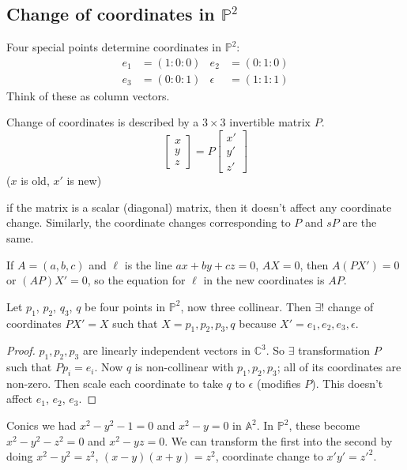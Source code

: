 \documentclass [letterpaper,11pt,twoside] {article}
\begin{document}
  \subsection{Change of coordinates in \texorpdfstring{$\mathbb P^2$}{P\^{}2}}
    Four special points determine coordinates in $\mathbb P^2$:
    \begin{align*}
      e_1 & = (1:0:0) & e_2 & = (0:1:0) \\
      e_3 & = (0:0:1) & \epsilon & = (1:1:1)
    \end{align*}
    Think of these as column vectors.

    Change of coordinates is described by a $3\times 3$ invertible matrix $P$.
    $$\begin{bmatrix} x \\ y \\ z \end{bmatrix} = P\begin{bmatrix} x' \\ y' \\ z' \end{bmatrix}$$
    ($x$ is old, $x'$ is new)

    if the matrix is a scalar (diagonal) matrix, then it doesn't affect any coordinate change.  Similarly, the coordinate changes corresponding to $P$ and $sP$ are the same.

    If $A = (a, b, c)$ and $\ell$ is the line $ax+by+cz= 0$, $AX = 0$, then $A(PX') = 0$ or $(AP)X' = 0$, so the equation for $\ell$ in the new coordinates is $AP$.
    \begin{prop*}
      Let $p_1$, $p_2$, $q_3$, $q$ be four points in $\mathbb P^2$, now three collinear.  Then $\exists!$ change of coordinates $PX' = X$ such that $X = p_1, p_2, p_3, q$ because $X' = e_1, e_2, e_3, \epsilon$.
    \end{prop*}
    \begin{proof}
      $p_1, p_2, p_3$ are linearly independent vectors in $\mathbb C^3$.  So $\exists$ transformation $P$ such that $Pp_i = e_i$.  Now $q$ is non-collinear with $p_1,p_2,p_3$; all of its coordinates are non-zero.  Then scale each coordinate to take $q$ to $\epsilon$ (modifies $P$).  This doesn't affect $e_1$, $e_2$, $e_3$.
    \end{proof}

    Conics we had $x^2 - y^2 - 1 = 0$ and $x^2 - y = 0$ in $\mathbb A^2$.  In $\mathbb P^2$, these become $x^2 - y^2 - z^2 = 0$ and $x^2 - yz = 0$.    We can transform the first into the second by doing $x^2 - y^2 = z^2$, $(x - y)(x + y) = z^2$, coordinate change to $x'y' = {z'}^2$.
\end{document}
